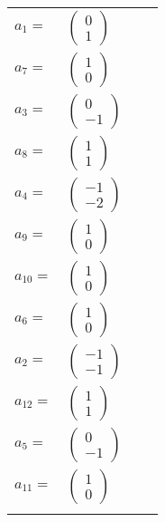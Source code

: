 \documentclass[1p]{elsarticle_modified}
\theoremstyle{definition}
\begin{document}
\begin{tabular}{m{7pt} m{180pt} m{7pt} m{180pt} }
\flushright $a_{1}=$&$\begin{pmatrix}0\\1\end{pmatrix}$ \\
\flushright $a_{7}=$&$\begin{pmatrix}1\\0\end{pmatrix}$ \\
\flushright $a_{3}=$&$\begin{pmatrix}0\\-1\end{pmatrix}$ \\
\flushright $a_{8}=$&$\begin{pmatrix}1\\1\end{pmatrix}$ \\
\flushright $a_{4}=$&$\begin{pmatrix}-1\\-2\end{pmatrix}$ \\
\flushright $a_{9}=$&$\begin{pmatrix}1\\0\end{pmatrix}$ \\
\flushright $a_{10}=$&$\begin{pmatrix}1\\0\end{pmatrix}$ \\
\flushright $a_{6}=$&$\begin{pmatrix}1\\0\end{pmatrix}$ \\
\flushright $a_{2}=$&$\begin{pmatrix}-1\\-1\end{pmatrix}$ \\
\flushright $a_{12}=$&$\begin{pmatrix}1\\1\end{pmatrix}$ \\
\flushright $a_{5}=$&$\begin{pmatrix}0\\-1\end{pmatrix}$ \\
\flushright $a_{11}=$&$\begin{pmatrix}1\\0\end{pmatrix}$\\&\end{tabular}
\end{document}
